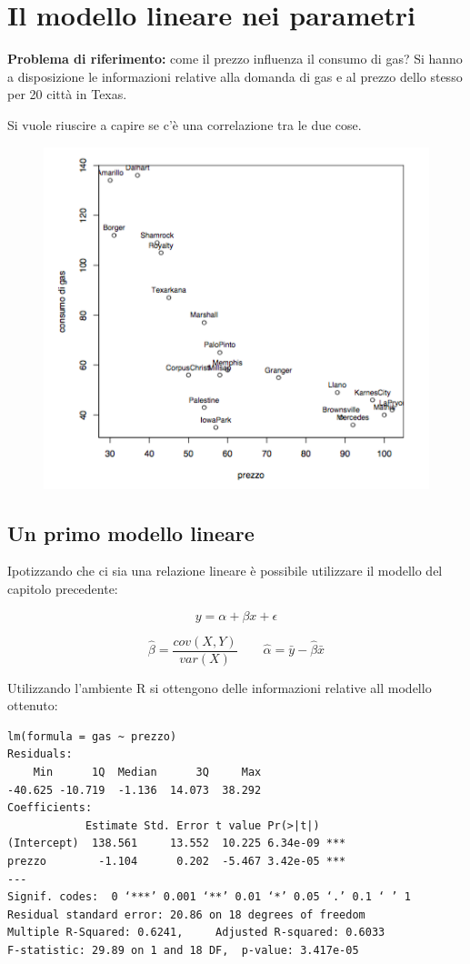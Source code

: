 \chapter{Il modello lineare nei parametri}

\textbf{Problema di riferimento:} come il prezzo influenza il consumo di
gas? Si hanno a disposizione le informazioni relative alla domanda di
gas e al prezzo dello stesso per 20 città in Texas.

Si vuole riuscire a capire se c'è una correlazione tra le due cose.

\begin{figure}[htbp]
	\centering
	\includegraphics[width=.5\textwidth]{./notes/immagini/l7-fig1.png}
\end{figure}

\section{Un primo modello lineare}\label{un-primo-modello-lineare}

Ipotizzando che ci sia una relazione lineare è possibile utilizzare il
modello del capitolo precedente:

$$
y = \alpha + \beta x + \epsilon
$$

$$
\hat{\beta} = \frac{cov(X,Y)}{var(X)} \qquad \hat{\alpha} = \bar{y} - \hat{\beta}\bar{x}
$$

Utilizzando l'ambiente R si ottengono delle informazioni relative all
modello ottenuto:

\begin{verbatim}
lm(formula = gas ~ prezzo)
Residuals:
    Min      1Q  Median      3Q     Max
-40.625 -10.719  -1.136  14.073  38.292
Coefficients:
            Estimate Std. Error t value Pr(>|t|)
(Intercept)  138.561     13.552  10.225 6.34e-09 ***
prezzo        -1.104      0.202  -5.467 3.42e-05 ***
---
Signif. codes:  0 ‘***’ 0.001 ‘**’ 0.01 ‘*’ 0.05 ‘.’ 0.1 ‘ ’ 1
Residual standard error: 20.86 on 18 degrees of freedom
Multiple R-Squared: 0.6241,     Adjusted R-squared: 0.6033
F-statistic: 29.89 on 1 and 18 DF,  p-value: 3.417e-05
\end{verbatim}

